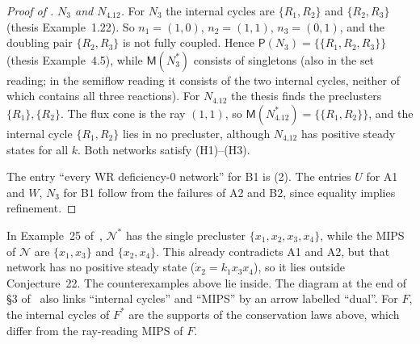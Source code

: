 \documentclass[11pt,a4paper]{report}
\newcommand{\Net}{\mathcal{N}}
\newcommand{\Pre}{\mathsf{P}}
\newcommand{\Mips}{\mathsf{M}}
\begin{document}
\begin{proof}[Proof of ]
\emph{\(N_3\) and \(N_{4.12}\).} For \(N_3\) the internal cycles are \(\{R_1,R_2\}\) and \(\{R_2,R_3\}\) (thesis
Example~1.22). So \(n_1=(1,0)\), \(n_2=(1,1)\), \(n_3=(0,1)\), and the doubling pair \(\{R_2,R_3\}\) is not fully
coupled. Hence \(\Pre(N_3)=\{\{R_1,R_2,R_3\}\}\) (thesis Example~4.5), while \(\Mips(N_3^*)\) consists of singletons
(also in the set reading; in the semiflow reading it consists of the two internal cycles, neither of which contains
all three reactions).
For \(N_{4.12}\) the thesis finds the preclusters \(\{R_1\},\{R_2\}\). The flux cone is the ray \((1,1)\), so
\(\Mips(N_{4.12}^*)=\{\{R_1,R_2\}\}\), and the internal cycle \(\{R_1,R_2\}\) lies in no precluster, although
\(N_{4.12}\) has positive steady states for all \(k\). Both networks satisfy (H1)--(H3).

The entry ``every WR deficiency-0 network'' for B1 is (2). The entries \(U\) for A1 and \(W\),
\(N_3\) for B1 follow from the failures of A2 and B2, since equality implies refinement.
\end{proof}

\begin{remark}
In Example~25 of~\autocite{Iosif2026}, \(\Net^*\) has the single precluster \(\{x_1,x_2,x_3,x_4\}\), while the
MIPS of \(\Net\) are \(\{x_1,x_3\}\) and \(\{x_2,x_4\}\). This already contradicts A1 and A2, but that network has no positive
steady state (\(\dot x_2=k_1x_3x_4\)), so it lies outside Conjecture~22. The counterexamples above lie inside. The
diagram at the end of §3 of~\autocite{Iosif2026} also links ``internal cycles'' and ``MIPS'' by an arrow labelled
``dual''. For \(F\), the internal cycles of \(F^*\) are the supports of the conservation laws above, which differ from
the ray-reading MIPS of \(F\).
\end{remark}
\end{document}
